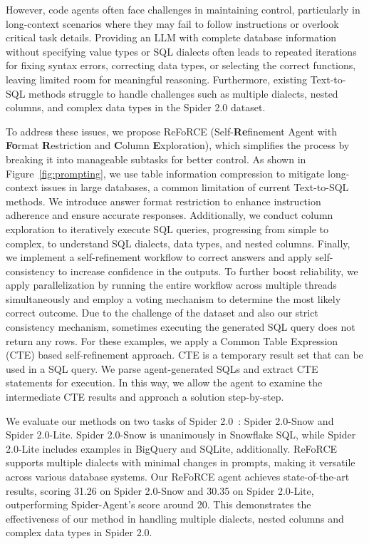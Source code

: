 However, code agents often face challenges in maintaining control, particularly in long-context scenarios where they may fail to follow instructions or overlook critical task details. Providing an LLM with complete database information without specifying value types or SQL dialects often leads to repeated iterations for fixing syntax errors, correcting data types, or selecting the correct functions, leaving limited room for meaningful reasoning. Furthermore, existing Text-to-SQL methods struggle to handle challenges such as multiple dialects, nested columns, and complex data types in the Spider 2.0 dataset.

To address these issues, we propose ReFoRCE (Self-\textbf{Re}finement Agent with \textbf{Fo}rmat \textbf{R}estriction and \textbf{C}olumn \textbf{E}xploration), which simplifies the process by breaking it into manageable subtasks for better control. As shown in Figure~\ref{fig:prompting}, we use table information compression to mitigate long-context issues in large databases, a common limitation of current Text-to-SQL methods. We introduce answer format restriction to enhance instruction adherence and ensure accurate responses. Additionally, we conduct column exploration to iteratively execute SQL queries, progressing from simple to complex, to understand SQL dialects, data types, and nested columns. Finally, we implement a self-refinement workflow to correct answers and apply self-consistency to increase confidence in the outputs. To further boost reliability, we apply parallelization by running the entire workflow across multiple threads simultaneously and employ a voting mechanism to determine the most likely correct outcome. Due to the challenge of the dataset and also our strict consistency mechanism, sometimes executing the generated SQL query does not return any rows. For these examples, we apply a Common Table Expression (CTE) based self-refinement approach. CTE is a temporary result set that can be used in a SQL query. We parse agent-generated SQLs and extract CTE statements for execution. In this way, we allow the agent to examine the intermediate CTE results and approach a solution step-by-step. 

We evaluate our methods on two tasks of Spider 2.0~\citep{lei2024spider}: Spider 2.0-Snow and Spider 2.0-Lite. Spider 2.0-Snow is unanimously in Snowflake SQL, while Spider 2.0-Lite includes examples in BigQuery and SQLite, additionally. ReFoRCE supports multiple dialects with minimal changes in prompts, making it versatile across various database systems. Our ReFoRCE agent achieves state-of-the-art results, scoring 31.26 on Spider 2.0-Snow and 30.35 on Spider 2.0-Lite, outperforming Spider-Agent's score around 20. This demonstrates the effectiveness of our method in handling multiple dialects, nested columns and complex data types in Spider 2.0.